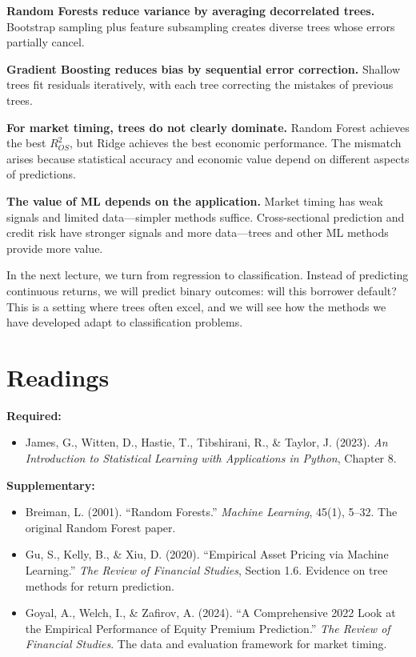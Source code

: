 \documentclass[11pt,a4paper]{article}
\begin{document}
\textbf{Random Forests reduce variance by averaging decorrelated trees.} Bootstrap sampling plus feature subsampling creates diverse trees whose errors partially cancel.

\textbf{Gradient Boosting reduces bias by sequential error correction.} Shallow trees fit residuals iteratively, with each tree correcting the mistakes of previous trees.

\textbf{For market timing, trees do not clearly dominate.} Random Forest achieves the best $R^2_{OS}$, but Ridge achieves the best economic performance. The mismatch arises because statistical accuracy and economic value depend on different aspects of predictions.

\textbf{The value of ML depends on the application.} Market timing has weak signals and limited data---simpler methods suffice. Cross-sectional prediction and credit risk have stronger signals and more data---trees and other ML methods provide more value.

In the next lecture, we turn from regression to classification. Instead of predicting continuous returns, we will predict binary outcomes: will this borrower default? This is a setting where trees often excel, and we will see how the methods we have developed adapt to classification problems.

\section*{Readings}

\textbf{Required:}
\begin{itemize}
    \item James, G., Witten, D., Hastie, T., Tibshirani, R., \& Taylor, J. (2023). \textit{An Introduction to Statistical Learning with Applications in Python}, Chapter 8.
\end{itemize}

\textbf{Supplementary:}
\begin{itemize}
    \item Breiman, L. (2001). ``Random Forests.'' \textit{Machine Learning}, 45(1), 5--32. The original Random Forest paper.
    \item Gu, S., Kelly, B., \& Xiu, D. (2020). ``Empirical Asset Pricing via Machine Learning.'' \textit{The Review of Financial Studies}, Section 1.6. Evidence on tree methods for return prediction.
    \item Goyal, A., Welch, I., \& Zafirov, A. (2024). ``A Comprehensive 2022 Look at the Empirical Performance of Equity Premium Prediction.'' \textit{The Review of Financial Studies}. The data and evaluation framework for market timing.
\end{itemize}

\end{document}
